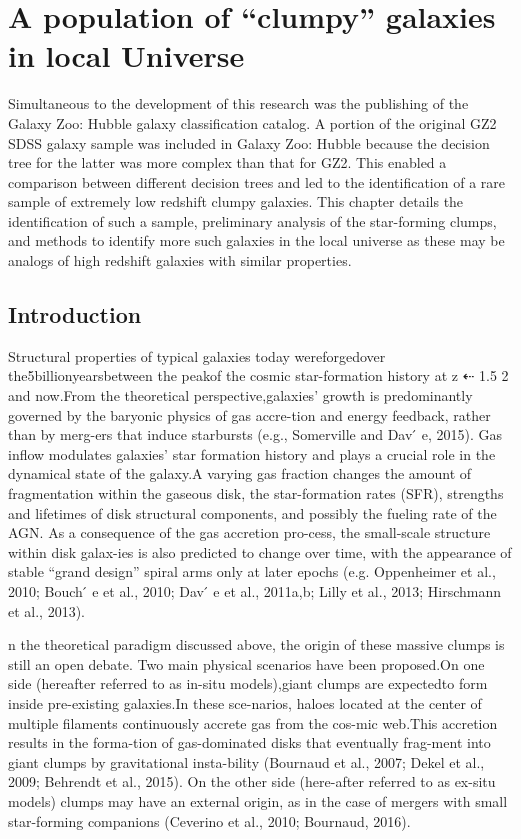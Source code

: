 
\chapter{A population of ``clumpy'' galaxies in local Universe}\label{chap:5}
Simultaneous to the development of this research was the publishing of the Galaxy Zoo: Hubble galaxy classification catalog. A portion of the original GZ2 SDSS galaxy sample was included in Galaxy Zoo: Hubble because the decision tree for the latter was more complex than that for GZ2. This enabled a comparison between different decision trees and led to the identification of a rare sample of extremely low redshift clumpy galaxies. This chapter details the identification of such a sample, preliminary analysis of the star-forming clumps, and methods to identify more such galaxies in the local universe as these may be analogs of high redshift galaxies with similar properties.

\section{Introduction}
Structural properties of typical galaxies today wereforgedover the5billionyearsbetween the peakof the cosmic star-formation history at z ⇠ 1.5  2 and now.From the theoretical perspective,galaxies’ growth is predominantly governed by the baryonic physics of gas accre-tion and energy feedback, rather than by merg-ers that induce starbursts (e.g., Somerville and Dav ́ e, 2015). Gas inflow modulates galaxies’ star formation history and plays a crucial role in the dynamical state of the galaxy.A varying gas fraction changes the amount of fragmentation within the gaseous disk, the star-formation rates (SFR), strengths and lifetimes of disk structural components, and possibly the fueling rate of the AGN. As a consequence of the gas accretion pro-cess, the small-scale structure within disk galax-ies is also predicted to change over time, with the appearance of stable “grand design” spiral arms only at later epochs (e.g. Oppenheimer et al., 2010; Bouch ́ e et al., 2010; Dav ́ e et al., 2011a,b; Lilly et al., 2013; Hirschmann et al., 2013). 

n the theoretical paradigm discussed above, the origin of these massive clumps is still an open debate. Two main physical scenarios have been proposed.On one side (hereafter referred to as in-situ models),giant clumps are expectedto form inside pre-existing galaxies.In these sce-narios, haloes located at the center of multiple filaments continuously accrete gas from the cos-mic web.This accretion results in the forma-tion of gas-dominated disks that eventually frag-ment into giant clumps by gravitational insta-bility (Bournaud et al., 2007; Dekel et al., 2009; Behrendt et al., 2015). On the other side (here-after referred to as ex-situ models) clumps may have an external origin, as in the case of mergers with small star-forming companions (Ceverino et al., 2010; Bournaud, 2016). 

